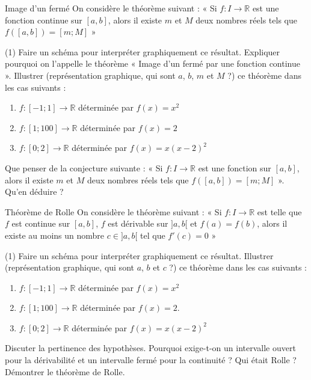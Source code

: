 \documentclass[a4paper,12pt]{article}
\begin{document}
\begin{activite}{Image d'un fermé}
\tcblower
On considère le théorème suivant : « Si $f: I \to \mathbb{R}$ est une fonction continue sur $[a,b]$, alors il existe $m$ et $M$ deux nombres réels tels que $f([a,b]) = [m;M]$ »

\begin{tasks}(1)
\task Faire un schéma pour interpréter graphiquement ce résultat.
\task Expliquer pourquoi on l'appelle le théorème « Image d'un fermé par une fonction continue ».
\task Illustrer (représentation graphique, qui sont $a$, $b$, $m$ et $M$ ?) ce théorème dans les cas suivants :
\begin{enumerate}
\item $f:[-1;1] \to \mathbb{R}$ déterminée par $f(x) = x^2$
\item $f:[1;100] \to \mathbb{R}$ déterminée par $f(x) = 2$
\item $f:[0;2] \to \mathbb{R}$ déterminée par $f(x) = x(x-2)^2$
\end{enumerate}
\task Que penser de la conjecture suivante : « Si $f: I \to \mathbb{R}$ est une fonction sur $[a,b]$, alors il existe $m$ et $M$ deux nombres réels tels que $f([a,b]) = [m;M]$ ». Qu'en déduire ?
\end{tasks}
\end{activite}
\begin{activite}{Théorème de Rolle}
\tcblower
On considère le théorème suivant : « Si $f: I \to \mathbb{R}$ est telle que $f$ est continue sur $[a,b]$, $f$ est dérivable sur $]a,b[$ et $f(a) = f(b)$, alors il existe au moins un nombre $c \in ]a,b[$ tel que $f'(c) = 0$ »

\begin{tasks}(1)
\task Faire un schéma pour interpréter graphiquement ce résultat.
\task Illustrer (représentation graphique, qui sont $a$, $b$ et $c$ ?) ce théorème dans les cas suivants :
\begin{enumerate}
\item $f:[-1;1] \to \mathbb{R}$ déterminée par $f(x) = x^2$
\item $f:[1;100] \to \mathbb{R}$ déterminée par $f(x) = 2$.
\item $f:[0;2] \to \mathbb{R}$ déterminée par $f(x) = x(x-2)^2$
\end{enumerate}
\task Discuter la pertinence des hypothèses.
\task * Pourquoi exige-t-on un intervalle ouvert pour la dérivabilité et un intervalle fermé pour la continuité ?
\task * Qui était Rolle ?
\task Démontrer le théorème de Rolle.
\end{tasks}
\end{activite}
\end{document}
